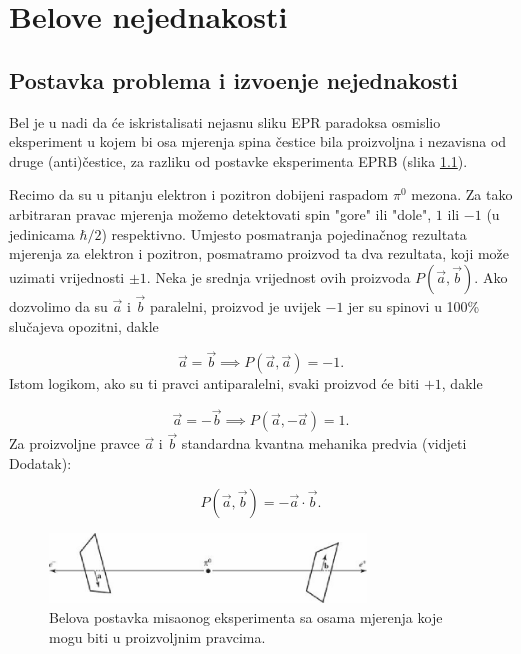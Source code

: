 \chapter{Belove nejednakosti}

\section{Postavka problema i izvo{\dj}enje nejednakosti}
Bel je u nadi da će iskristalisati nejasnu sliku EPR paradoksa osmislio eksperiment u kojem bi osa mjerenja spina čestice bila proizvoljna i nezavisna od druge (anti)čestice, za razliku od postavke eksperimenta EPRB (slika \ref{fig:bell_exp_figure}).

Recimo da su u pitanju elektron i pozitron dobijeni raspadom $\pi^0$ mezona.
Za tako arbitraran pravac mjerenja možemo detektovati spin "gore" ili "dole", $1$ ili $-1$ (u jedinicama $\hbar/2$) respektivno.
Umjesto posmatranja pojedinačnog rezultata mjerenja za elektron i pozitron, posmatramo proizvod ta dva rezultata, koji može uzimati vrijednosti $\pm1$.
Neka je srednja vrijednost ovih proizvoda $P(\vec{a},\vec{b})$.
Ako dozvolimo da su $\vec{a}$ i $\vec{b}$ paralelni, proizvod je uvijek $-1$ jer su spinovi u 100\% slučajeva opozitni, dakle

\begin{equation}
    \vec{a} = \vec{b} \implies P(\vec{a}, \vec{a}) = -1.
\end{equation}
Istom logikom, ako su ti pravci antiparalelni, svaki proizvod će biti $+1$, dakle

\begin{equation}
    \vec{a} = -\vec{b} \implies P(\vec{a}, -\vec{a}) = 1.
\end{equation}
Za proizvoljne pravce $\vec{a}$ i $\vec{b}$ standardna kvantna mehanika predvi\dj a (vidjeti Dodatak):

\begin{equation}
    P(\vec{a}, \vec{b}) = - \vec{a} \cdot \vec{b}. \label{eq:srednja_vrijednost_proizvoda}
\end{equation}

\begin{figure}[H]
    \centering
    \includegraphics[width=0.75\textwidth]{figures/bell_scheme.eps}
    \caption{Belova postavka misaonog eksperimenta sa osama mjerenja koje mogu biti
        u proizvoljnim pravcima.}
    \label{fig:bell_exp_figure}
\end{figure}

